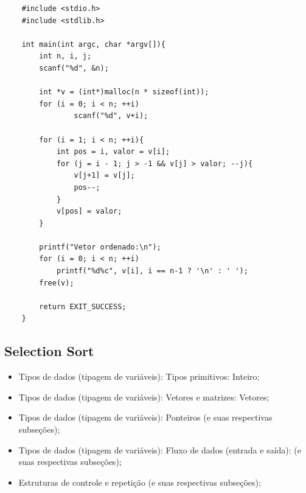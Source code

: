 \documentclass[12pt]{article}
\begin{document}
\hspace{0.25cm}
\begin{lstlisting}
    #include <stdio.h>
    #include <stdlib.h>
        
    int main(int argc, char *argv[]){
        int n, i, j;
        scanf("%d", &n);
            
        int *v = (int*)malloc(n * sizeof(int));
        for (i = 0; i < n; ++i)
                scanf("%d", v+i);
    
        for (i = 1; i < n; ++i){
            int pos = i, valor = v[i];
    		for (j = i - 1; j > -1 && v[j] > valor; --j){
    		    v[j+1] = v[j];
    		    pos--;
    		}
    		v[pos] = valor;
        }
        
        printf("Vetor ordenado:\n");
        for (i = 0; i < n; ++i)
            printf("%d%c", v[i], i == n-1 ? '\n' : ' ');
        free(v);
        
        return EXIT_SUCCESS;
    }
\end{lstlisting}

\newpage
\subsection{Selection Sort}

\hspace{0.25cm}
\begin{tcolorbox}[colback=violet!5!white,colframe=violet!75!white,title=Capítulos recomendados:]
    \begin{itemize}
        \item Tipos de dados (tipagem de variáveis): Tipos primitivos: Inteiro;
        \item Tipos de dados (tipagem de variáveis): Vetores e matrizes: Vetores;
        \item Tipos de dados (tipagem de variáveis): Ponteiros (e suas respectivas subseções);
        \item Tipos de dados (tipagem de variáveis): Fluxo de dados (entrada e saída): (e suas respectivas subseções);
        \item Estruturas de controle e repetição (e suas respectivas subseções);
    \end{itemize}
\end{tcolorbox}
\end{document}
